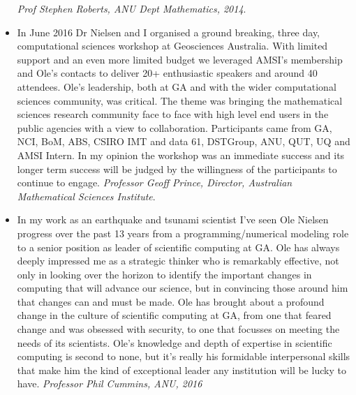 \documentclass[11pt,a4paper]{article}
\begin{document}
\begin{itemize}
    \emph{Prof Stephen Roberts, ANU Dept Mathematics, 2014}.
\item In June 2016 Dr Nielsen and I organised a ground breaking, three day, computational sciences workshop at Geosciences Australia. With limited support and an even more limited budget we leveraged AMSI’s membership and Ole’s contacts to deliver 20+ enthusiastic speakers and around 40 attendees. Ole’s leadership, both at GA and with the wider computational sciences community, was critical. The theme was bringing the mathematical sciences research community face to face with high level end users in the public agencies with a view to collaboration. Participants came from GA, NCI, BoM, ABS, CSIRO IMT and data 61, DSTGroup, ANU, QUT, UQ and AMSI Intern. In my opinion the workshop was an immediate success and its longer term success will be judged by the willingness of the participants to continue to engage.
  \emph{Professor Geoff Prince, Director, Australian Mathematical Sciences Institute}.
\item In my work as an earthquake and tsunami scientist I've seen Ole Nielsen progress over the past 13 years from a programming/numerical modeling role to a senior position as leader of scientific computing at GA. Ole has always deeply impressed me as a strategic thinker who is remarkably effective, not only in looking over the horizon to identify the important changes in computing that will advance our science, but in convincing those around him that changes can and must be made. Ole has brought about a profound change in the culture of scientific computing at GA, from one that feared change and was obsessed with security, to one that focusses on meeting the needs of its scientists. Ole's knowledge and depth of expertise in scientific computing is second to none, but it's really his formidable interpersonal skills that make him the kind of exceptional leader any institution will be lucky to have.
  \emph{Professor Phil Cummins, ANU, 2016}
  

\end{itemize}
\end{document}

